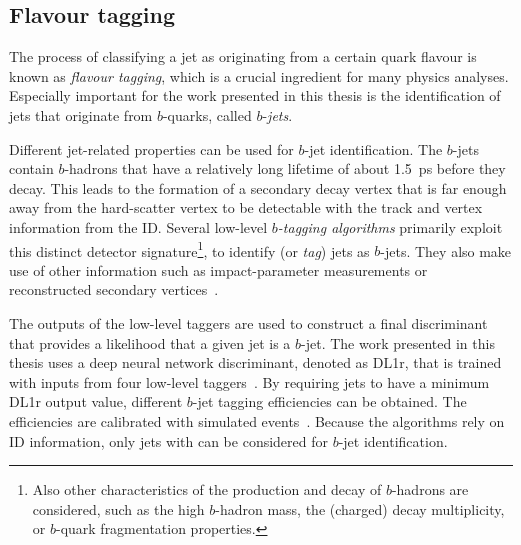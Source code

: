 \subsection{Flavour tagging}
The process of classifying a jet as originating from a certain quark flavour is known as \emph{flavour tagging}, which is a crucial ingredient for many physics analyses. Especially important for the work presented in this thesis is the identification of jets that originate from $b$-quarks, called $b$-\emph{jets}.

Different jet-related properties can be used for $b$-jet identification.
The $b$-jets contain $b$-hadrons that have a relatively long lifetime of about \SI{1.5}{\pico\second} before they decay. This leads to the formation of a secondary decay vertex that is far enough away from the hard-scatter vertex to be detectable with the track and vertex information from the ID.
Several low-level \emph{$b$-tagging algorithms} primarily exploit this distinct detector signature\footnote{Also other characteristics of the production and decay of $b$-hadrons are considered, such as the high $b$-hadron mass, the (charged) decay multiplicity, or $b$-quark fragmentation properties.}, to identify (or \emph{tag}) jets as $b$-jets. They also make use of other information such as impact-parameter measurements or reconstructed secondary vertices~\cite{ATL-PHYS-PUB-2017-013}.

The outputs of the low-level taggers are used to construct a final discriminant that provides a likelihood that a given jet is a $b$-jet. The work presented in this thesis uses a deep neural network discriminant, denoted as DL1r, that is trained with inputs from four low-level taggers~\cite{ATL-PHYS-PUB-2017-013}.
By requiring jets to have a minimum DL1r output value, different $b$-jet tagging efficiencies can be obtained. The efficiencies are calibrated with simulated \ttbar events~\cite{FTAG-2018-01}.
Because the algorithms rely on ID information, only jets with  can be considered for $b$-jet identification.



